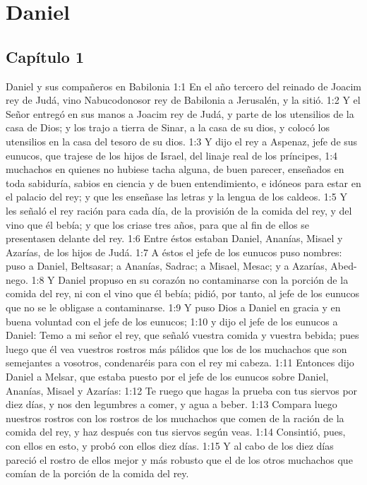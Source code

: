 \chapter{Daniel}

\section*{Capítulo 1}

Daniel y sus compañeros en Babilonia 
1:1 En el año tercero del reinado de Joacim rey de Judá, vino Nabucodonosor rey de Babilonia a Jerusalén, y la sitió. 
1:2 Y el Señor entregó en sus manos a Joacim rey de Judá, y parte de los utensilios de la casa de Dios; y los trajo a tierra de Sinar, a la casa de su dios, y colocó los utensilios en la casa del tesoro de su dios. 
1:3 Y dijo el rey a Aspenaz, jefe de sus eunucos, que trajese de los hijos de Israel, del linaje real de los príncipes, 
1:4 muchachos en quienes no hubiese tacha alguna, de buen parecer, enseñados en toda sabiduría, sabios en ciencia y de buen entendimiento, e idóneos para estar en el palacio del rey; y que les enseñase las letras y la lengua de los caldeos. 
1:5 Y les señaló el rey ración para cada día, de la provisión de la comida del rey, y del vino que él bebía; y que los criase tres años, para que al fin de ellos se presentasen delante del rey. 
1:6 Entre éstos estaban Daniel, Ananías, Misael y Azarías, de los hijos de Judá. 
1:7 A éstos el jefe de los eunucos puso nombres: puso a Daniel, Beltsasar; a Ananías, Sadrac; a Misael, Mesac; y a Azarías, Abed-nego. 
1:8 Y Daniel propuso en su corazón no contaminarse con la porción de la comida del rey, ni con el vino que él bebía; pidió, por tanto, al jefe de los eunucos que no se le obligase a contaminarse. 
1:9 Y puso Dios a Daniel en gracia y en buena voluntad con el jefe de los eunucos; 
1:10 y dijo el jefe de los eunucos a Daniel: Temo a mi señor el rey, que señaló vuestra comida y vuestra bebida; pues luego que él vea vuestros rostros más pálidos que los de los muchachos que son semejantes a vosotros, condenaréis para con el rey mi cabeza. 
1:11 Entonces dijo Daniel a Melsar, que estaba puesto por el jefe de los eunucos sobre Daniel, Ananías, Misael y Azarías: 
1:12 Te ruego que hagas la prueba con tus siervos por diez días, y nos den legumbres a comer, y agua a beber. 
1:13 Compara luego nuestros rostros con los rostros de los muchachos que comen de la ración de la comida del rey, y haz después con tus siervos según veas. 
1:14 Consintió, pues, con ellos en esto, y probó con ellos diez días. 
1:15 Y al cabo de los diez días pareció el rostro de ellos mejor y más robusto que el de los otros muchachos que comían de la porción de la comida del rey. 
